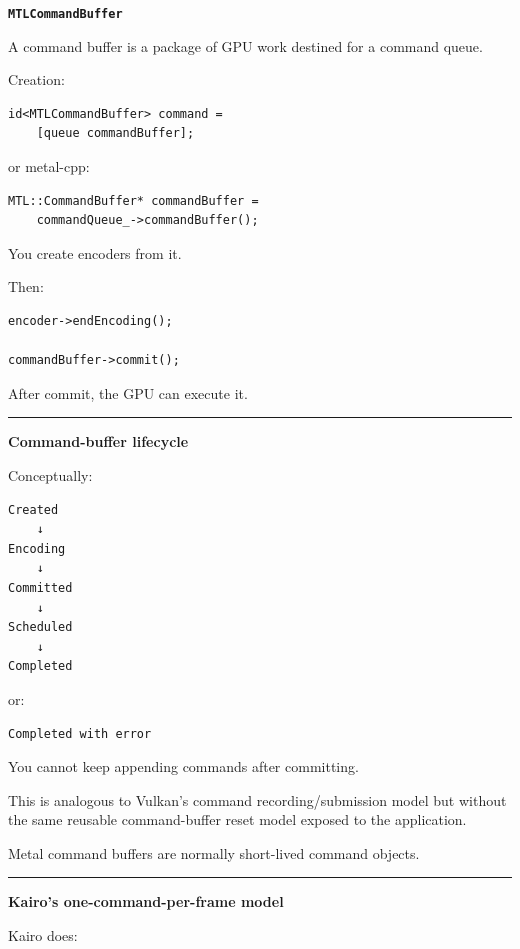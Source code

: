 \textbf{\texttt{MTLCommandBuffer}}

A command buffer is a package of GPU work destined for a command queue.

Creation:

\begin{verbatim}
id<MTLCommandBuffer> command =
    [queue commandBuffer];
\end{verbatim}

or metal-cpp:

\begin{verbatim}
MTL::CommandBuffer* commandBuffer =
    commandQueue_->commandBuffer();
\end{verbatim}

You create encoders from it.

Then:

\begin{verbatim}
encoder->endEncoding();

commandBuffer->commit();
\end{verbatim}

After commit, the GPU can execute it.

\begin{center}\rule{0.5\linewidth}{0.5pt}\end{center}

\textbf{Command-buffer lifecycle}

Conceptually:

\begin{verbatim}
Created
    ↓
Encoding
    ↓
Committed
    ↓
Scheduled
    ↓
Completed
\end{verbatim}

or:

\begin{verbatim}
Completed with error
\end{verbatim}

You cannot keep appending commands after committing.

This is analogous to Vulkan's command recording/submission model but without the same reusable command-buffer reset model exposed to the application.

Metal command buffers are normally short-lived command objects.

\begin{center}\rule{0.5\linewidth}{0.5pt}\end{center}

\textbf{Kairo's one-command-per-frame model}

Kairo does:

